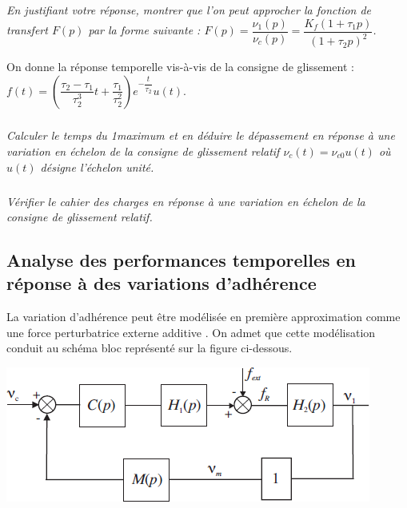 \documentclass[10pt,fleqn]{article} %
\begin{document}
\begin{multicols}{2}
\begin{corrige}
\begin{itemize}
\end{itemize}
\end{corrige}
\else
\fi


\subparagraph{}\textit{En justifiant votre réponse, montrer que l’on peut approcher la fonction de
transfert $F(p)$ par la forme suivante : $ F(p)=\dfrac{\nu_1(p)}{\nu_c(p)}=\dfrac{K_f\left( 1+\tau_1 p\right)}{\left( 1+\tau_2 p\right)^2 } $.}
\ifprof
\begin{corrige}

\end{corrige}
\else
\fi

On donne la réponse temporelle vis-à-vis de la consigne de glissement : $f(t)=\left( \dfrac{\tau_2 - \tau_1 }{\tau_2^3 }t +\dfrac{\tau_1}{\tau_2^2} \right)e^{-\dfrac{t}{\tau_2}} u(t)$.




\subparagraph{}\textit{Calculer le temps du 1\ier maximum et en déduire le
dépassement en réponse à une variation en échelon de la consigne de glissement
relatif $\nu_c(t)=\nu_{c0}u(t)$ où $u(t)$ désigne l’échelon unité.}
\ifprof
\begin{corrige}
\end{corrige}
\else
\fi


\subparagraph{}\textit{Vérifier le cahier des charges en réponse à une variation en échelon de la consigne de glissement relatif.}
\ifprof
\begin{corrige}
\end{corrige}
\else
\fi

\subsection*{Analyse des performances temporelles en réponse à des variations d’adhérence}
La variation d’adhérence peut être modélisée en première approximation comme une force perturbatrice externe additive . On admet que cette modélisation conduit au schéma bloc représenté sur la figure ci-dessous.

\begin{center}
\includegraphics[width=\linewidth]{images/fig_03}
\end{center}


\end{multicols}
\end{document}
